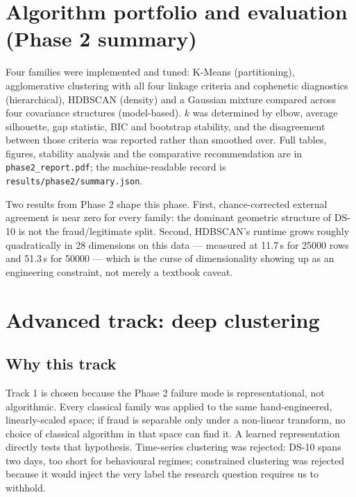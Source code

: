 \documentclass[11pt, a4paper]{article}
\providecommand{\num}[1]{#1}
\begin{document}
\section{Algorithm portfolio and evaluation (Phase 2 summary)}

Four families were implemented and tuned: K-Means (partitioning), agglomerative
clustering with all four linkage criteria and cophenetic diagnostics
(hierarchical), HDBSCAN (density) and a Gaussian mixture compared across four
covariance structures (model-based). $k$ was determined by elbow, average
silhouette, gap statistic, BIC and bootstrap stability, and the disagreement
between those criteria was reported rather than smoothed over. Full tables,
figures, stability analysis and the comparative recommendation are in
\texttt{phase2\_report.pdf}; the machine-readable record is
\texttt{results/phase2/summary.json}.

Two results from Phase 2 shape this phase. First, chance-corrected external
agreement is near zero for every family: the dominant geometric structure of
DS-10 is not the fraud/legitimate split. Second, HDBSCAN's runtime grows
roughly quadratically in 28 dimensions on this data --- measured at
11.7\,s for \num{25000} rows and 51.3\,s for \num{50000}
--- which is the curse of dimensionality showing up as an engineering
constraint, not merely a textbook caveat.

\section{Advanced track: deep clustering}

\subsection{Why this track}
Track 1 is chosen because the Phase 2 failure mode is representational, not
algorithmic. Every classical family was applied to the same hand-engineered,
linearly-scaled space; if fraud is separable only under a non-linear transform,
no choice of classical algorithm in that space can find it. A learned
representation directly tests that hypothesis. Time-series clustering was
rejected: DS-10 spans two days, too short for behavioural regimes; constrained
clustering was rejected because it would inject the very label the research
question requires us to withhold.
\end{document}
